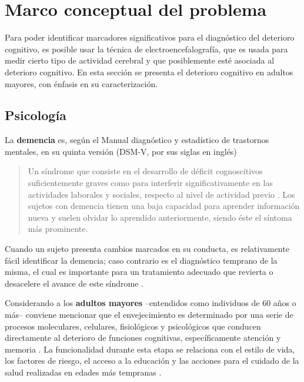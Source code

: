 
\chapter{Marco conceptual del problema}

Para poder identificar marcadores significativos para el diagnóstico del deterioro cognitivo, es 
posible usar la técnica de electroencefalografía, que es usada para medir cierto tipo de actividad 
cerebral y que posiblemente esté asociada al deterioro cognitivo. 
%
En esta sección se presenta el deterioro cognitivo en adultos mayores, con énfasis en su 
caracterización.


\section{Psicología}

La \textbf{demencia} es, según el Manual diagnóstico y estadístico de trastornos mentales, en su 
quinta versión (DSM-V, por sus siglas en inglés)
\begin{quote}
Un síndrome que consiste en el desarrollo de déficit cognoscitivos suficientemente graves como para 
interferir significativamente en las actividades laborales y sociales, respecto al nivel de 
actividad previo \cite{DCM5}.
%
Los sujetos con demencia tienen una baja capacidad para aprender información nueva y suelen olvidar 
lo aprendido anteriormente, siendo éste el síntoma más prominente.
\end{quote}

Cuando un sujeto presenta cambios marcados en su conducta, es relativamente fácil identificar la 
demencia; caso contrario es el diagnóstico temprano de la misma, el cual es importante para un 
tratamiento adecuado que revierta o desacelere el avance de este síndrome \cite{Knopman01}.

Considerando a los \textbf{adultos mayores} --entendidos como individuos de 60 años o más--
conviene mencionar que el envejecimiento es determinado por una serie de procesos moleculares, 
celulares, fisiológicos y psicológicos que conducen directamente al deterioro de funciones 
cognitivas, específicamente atención y memoria \cite{Park09}.
%
La funcionalidad durante esta etapa se relaciona con el estilo de vida, los factores de riesgo, el 
acceso a la educación y las acciones para el cuidado de la salud realizadas en edades más 
tempranas \cite{Sanhueza14}.

